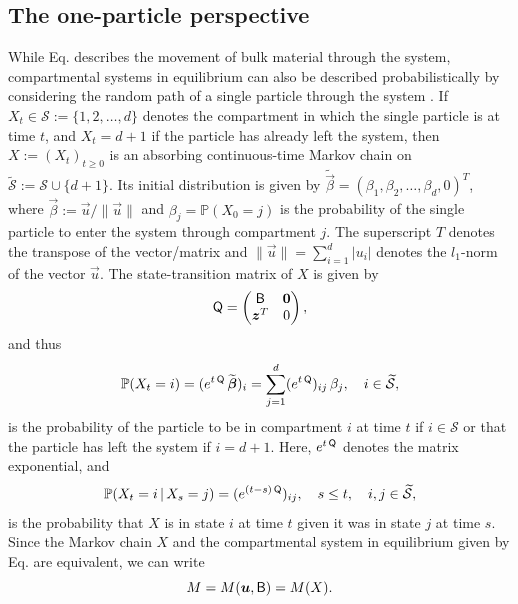\documentclass[smallextended]{svjour3}
\makeatletter
\renewcommand*{\eqref}[1]{%
  \hyperref[{#1}]{\textup{\tagform@{\ref*{#1}}}}%
}
\renewcommand{\P}{\mathbb{P}}
\newcommand{\suml}{\sum\limits}
\newcommand{\vnorms}[1]{\|#1\|}
\makeatother
\begin{document}
\subsection{The one-particle perspective}
\label{sec:the_one_particle_perspective}
While Eq. \eqref{eqn:lin_CS_sys} describes the movement of bulk material through the system, compartmental systems in equilibrium can also be described probabilistically by considering the random path of a single particle through the system \citep{Metzler2018MGS}.
If $X_t\in\mathcal{S}:=\{1,2,\ldots,d\}$ denotes the compartment in which the single particle is at time $t$, and $X_t=d+1$ if the particle has already left the system, then $X:=(X_t)_{t\geq0}$ is an absorbing continuous-time Markov chain \citep{Norris1997} on $\widetilde{\mathcal{S}}:=\mathcal{S}\cup\{d+1\}$.
Its initial distribution is given by $\widetilde{\vec{\beta}}=(\beta_1, \beta_2, \ldots, \beta_d, 0)^T$, where $\vec{\beta}:=\vec{u}/\vnorms{\vec{u}}$ and $\beta_j=\P(X_0=j)$ is the probability of the single particle to enter the system through compartment $j$.
The superscript $T$ denotes the transpose of the vector/matrix  and $\vnorms{\vec{u}}=\sum_{i=1}^d |u_i|$ denotes the $l_1$-norm of the vector $\vec{u}$.
The state-transition matrix of $X$ is given by
\begin{equation}\label{eqn:Q}
  \tens{Q} =
  \begin{pmatrix}
    \tens{B} & \vec{0} \\
    \vec{z}^T & 0
  \end{pmatrix},
\end{equation}
and thus
\begin{equation*}
  \P(X_t=i) = (e^{t\,\tens{Q}}\,\widetilde{\vec{\beta}})_i = \suml_{j=1}^d (e^{t\,\tens{Q}})_{ij}\,\beta_j, \quad i\in\widetilde{\mathcal{S}},
\end{equation*}
is the probability of the particle to be in compartment $i$ at time $t$ if $i\in\mathcal{S}$ or that the particle has left the system if $i=d+1$.
Here, $e^{t\,\mathsf{Q}}$ denotes the matrix exponential, and 
\begin{equation*}
  \P(X_t=i\,|\,X_s=j) = (e^{(t-s)\,\tens{Q}})_{ij},\quad s\leq t,\quad i,j\in\widetilde{\mathcal{S}},
\end{equation*}
is the probability that $X$ is in state $i$ at time $t$ given it was in state $j$ at time $s$.
Since the Markov chain $X$ and the compartmental system in equilibrium given by Eq. \eqref{eqn:lin_CS_sys} are equivalent, we can write
\begin{equation*}
  M=M(\vec{u},\tens{B}) = M(X).
\end{equation*}
\end{document}
